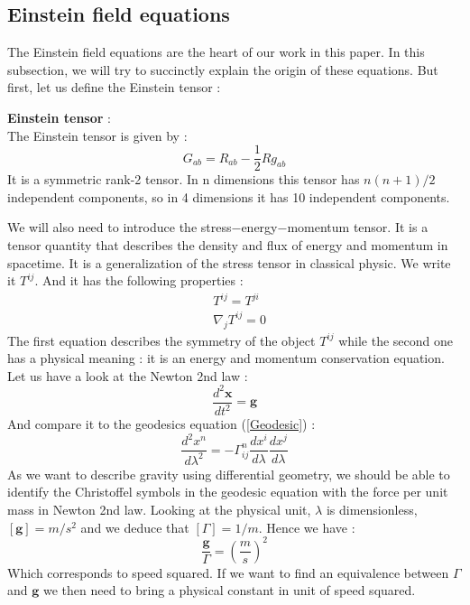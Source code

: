 \documentclass[a4paper,12pt]{article}
\theoremstyle{definition}
\begin{document}
\subsection{Einstein field equations}
The Einstein field equations are the heart of our work in this paper.
In this subsection, we will try to succinctly explain the origin of these equations.
But first, let us define the Einstein tensor : 
\begin{definition}
	\textbf{Einstein tensor} :\\
	The Einstein tensor is given by :
	\begin{equation}
		G_{ab}=R_{ab}-\frac{1}{2}Rg_{ab}
	\end{equation}
	It is a symmetric rank-2 tensor. In n dimensions this tensor has $n(n+1)/2$ independent components, so in 4 dimensions it has 10 independent components.
\end{definition}
We will also need to introduce the stress$-$energy$-$momentum tensor.
It is a tensor quantity that describes the density and flux of energy and momentum in spacetime.
It is a generalization of the stress tensor in classical physic.
We write it $T^{ij}$.
And it has the following properties :
\begin{align}
	&T^{ij}=T^{ji}\\
	&\nabla_j T^{ij}=0\label{conserv}
\end{align}
The first equation describes the symmetry of the object $T^{ij}$ while the second one has a physical meaning : it is an energy and momentum conservation equation.\\
Let us have a look at the Newton 2nd law :
\begin{equation}
	\frac{d^2\boldsymbol{x}}{dt^2}=\boldsymbol{g}
\end{equation}
And compare it to the geodesics equation (\ref{Geodesic}) :
\begin{equation}
	\frac{d^2x^n}{d\lambda^2}=-\Gamma^n_{ij}\frac{dx^i}{d\lambda}\frac{dx^j}{d\lambda}
\end{equation}
As we want to describe gravity using differential geometry, we should be able to identify the Christoffel symbols in the geodesic equation with the force per unit mass in Newton 2nd law.
Looking at the physical unit, $\lambda$ is dimensionless, $[\boldsymbol{g}]=m/s^2$ and we deduce that $[\Gamma]=1/m$.
Hence we have :
\begin{equation}
	\frac{\boldsymbol{g}}{\Gamma}=(\frac{m}{s})^2
\end{equation}
Which corresponds to speed squared.
If we want to find an equivalence between $\Gamma$ and $\boldsymbol{g}$ we then need to bring a physical constant in unit of speed squared.
\end{document}
